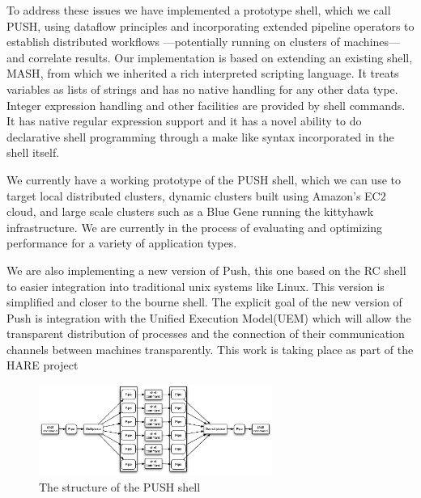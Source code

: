 To address these issues we have implemented a prototype shell, which
we call PUSH, using dataflow principles and incorporating extended
pipeline operators to establish distributed workflows ---potentially
running on clusters of machines--- and correlate results.  Our
implementation is based on extending an existing shell, MASH\cite{mashman},
from which we inherited a rich interpreted scripting language.  It
treats variables as lists of strings and has no native handling for
any other data type.  Integer expression handling and other facilities
are provided by shell commands.  It has native regular expression
support and it has a novel ability to do declarative shell programming
through a make like syntax incorporated in the shell itself.

We currently have a working prototype of the PUSH shell, which we
can use to target local distributed clusters, dynamic clusters built
using Amazon's EC2 cloud, and large scale clusters such as a Blue
Gene running the kittyhawk infrastructure.  We are currently in the
process of evaluating and optimizing performance for a variety of
application types.


We are also implementing a new version of Push, this one based on
the RC shell\cite{rcpaper} to easier integration into traditional unix
systems like Linux. This version is simplified and closer to the
bourne shell. The explicit goal of the new version of Push is
integration with the Unified Execution Model(UEM)\cite{van-unified} which will
allow the transparent distribution of processes and the connection
of their communication channels between machines transparently.
This work is taking place as part of the HARE project\cite{van2008holistic} 


\begin{figure}[htp]
\centering
\includegraphics[width=3in]{pipestruct.eps}
\caption{The structure of the PUSH shell}
\label{fig:pipestruct} 
\end{figure}

